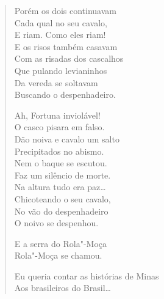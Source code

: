 \begin{verse}
\quad\quad\quad{}Porém os dois continuavam\\
\quad\quad\quad{}Cada qual no seu cavalo,\\
\quad\quad\quad{}E riam. Como eles riam!\\
\quad\quad\quad{}E os risos também casavam\\
\quad\quad\quad{}Com as risadas dos cascalhos\\
\quad\quad\quad{}Que pulando levianinhos\\
\quad\quad\quad{}Da vereda se soltavam\\
\quad\quad\quad{}Buscando o despenhadeiro.

\quad\quad\quad{}Ah, Fortuna inviolável!\\
\quad\quad\quad{}O casco pisara em falso.\\
\quad\quad\quad{}Dão noiva e cavalo um salto\\
\quad\quad\quad{}Precipitados no abismo.\\
\quad\quad\quad{}Nem o baque se escutou.\\
\quad\quad\quad{}Faz um silêncio de morte.\\
\quad\quad\quad{}Na altura tudo era paz\ldots{}\\
\quad\quad\quad{}Chicoteando o seu cavalo,\\
\quad\quad\quad{}No vão do despenhadeiro\\
\quad\quad\quad{}O noivo se despenhou.

\quad\quad\quad{}E a serra do Rola"-Moça\\
\quad\quad\quad{}Rola"-Moça se chamou.

Eu queria contar as histórias de Minas\\
Aos brasileiros do Brasil\ldots{}


\end{verse}
